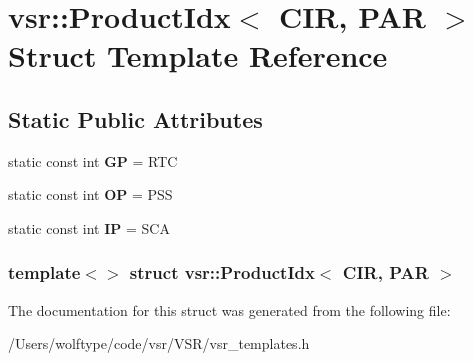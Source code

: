 \hypertarget{structvsr_1_1_product_idx_3_01_c_i_r_00_01_p_a_r_01_4}{\section{vsr\-:\-:Product\-Idx$<$ C\-I\-R, P\-A\-R $>$ Struct Template Reference}
\label{structvsr_1_1_product_idx_3_01_c_i_r_00_01_p_a_r_01_4}
}
\subsection*{Static Public Attributes}
\begin{DoxyCompactItemize}
\item 
\hypertarget{structvsr_1_1_product_idx_3_01_c_i_r_00_01_p_a_r_01_4_aae78f898f8ec8207b1ce1ad41f0e73b5}{static const int {\bfseries G\-P} = R\-T\-C}\label{structvsr_1_1_product_idx_3_01_c_i_r_00_01_p_a_r_01_4_aae78f898f8ec8207b1ce1ad41f0e73b5}

\item 
\hypertarget{structvsr_1_1_product_idx_3_01_c_i_r_00_01_p_a_r_01_4_a5c29831edb635cc3f61c60d55ca4a4af}{static const int {\bfseries O\-P} = P\-S\-S}\label{structvsr_1_1_product_idx_3_01_c_i_r_00_01_p_a_r_01_4_a5c29831edb635cc3f61c60d55ca4a4af}

\item 
\hypertarget{structvsr_1_1_product_idx_3_01_c_i_r_00_01_p_a_r_01_4_a6cc58831f5fdffc7df3954ca652fd905}{static const int {\bfseries I\-P} = S\-C\-A}\label{structvsr_1_1_product_idx_3_01_c_i_r_00_01_p_a_r_01_4_a6cc58831f5fdffc7df3954ca652fd905}

\end{DoxyCompactItemize}
\subsubsection*{template$<$$>$ struct vsr\-::\-Product\-Idx$<$ C\-I\-R, P\-A\-R $>$}



The documentation for this struct was generated from the following file\-:\begin{DoxyCompactItemize}
\item 
/\-Users/wolftype/code/vsr/\-V\-S\-R/vsr\-\_\-templates.\-h\end{DoxyCompactItemize}
